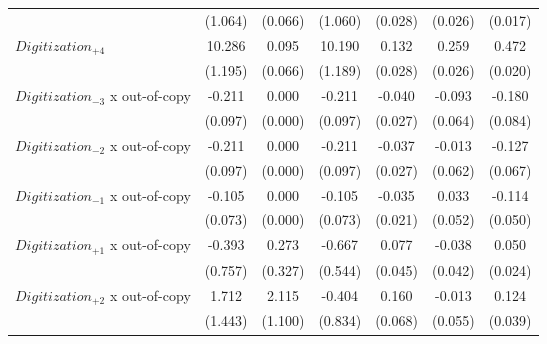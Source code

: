 {\begin{tabular*}{\hsize}{@{\hskip\tabcolsep\extracolsep\fill}l*{6}{c}}
            &     (1.064)\sym{***}&     (0.066)         &     (1.060)\sym{***}&     (0.028)\sym{***}&     (0.026)\sym{***}&     (0.017)\sym{***}\\
\addlinespace
$Digitization_{+4}$&      10.286         &       0.095         &      10.190         &       0.132         &       0.259         &       0.472         \\
            &     (1.195)\sym{***}&     (0.066)         &     (1.189)\sym{***}&     (0.028)\sym{***}&     (0.026)\sym{***}&     (0.020)\sym{***}\\
\addlinespace
$Digitization_{-3}$ x out-of-copy&      -0.211         &       0.000         &      -0.211         &      -0.040         &      -0.093         &      -0.180         \\
            &     (0.097)\sym{**} &     (0.000)         &     (0.097)\sym{**} &     (0.027)\sym{+}  &     (0.064)\sym{+}  &     (0.084)\sym{**} \\
\addlinespace
$Digitization_{-2}$ x out-of-copy&      -0.211         &       0.000         &      -0.211         &      -0.037         &      -0.013         &      -0.127         \\
            &     (0.097)\sym{**} &     (0.000)         &     (0.097)\sym{**} &     (0.027)         &     (0.062)         &     (0.067)\sym{*}  \\
\addlinespace
$Digitization_{-1}$ x out-of-copy&      -0.105         &       0.000         &      -0.105         &      -0.035         &       0.033         &      -0.114         \\
            &     (0.073)         &     (0.000)         &     (0.073)         &     (0.021)\sym{*}  &     (0.052)         &     (0.050)\sym{**} \\
\addlinespace
$Digitization_{+1}$ x out-of-copy&      -0.393         &       0.273         &      -0.667         &       0.077         &      -0.038         &       0.050         \\
            &     (0.757)         &     (0.327)         &     (0.544)         &     (0.045)\sym{*}  &     (0.042)         &     (0.024)\sym{**} \\
\addlinespace
$Digitization_{+2}$ x out-of-copy&       1.712         &       2.115         &      -0.404         &       0.160         &      -0.013         &       0.124         \\
            &     (1.443)         &     (1.100)\sym{*}  &     (0.834)         &     (0.068)\sym{**} &     (0.055)         &     (0.039)\sym{***}\\

\end{tabular*}}
